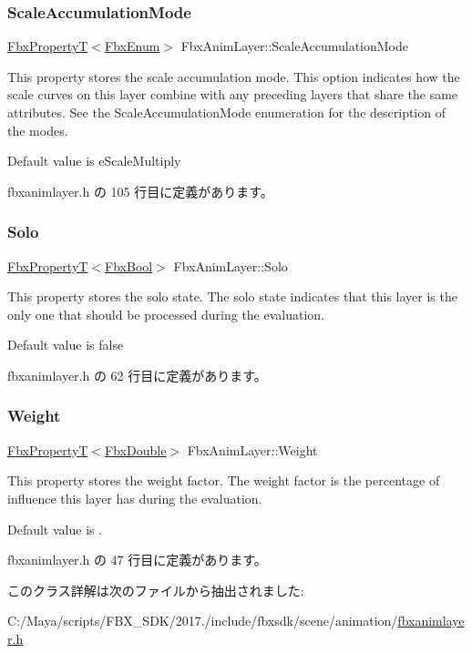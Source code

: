 \subsubsection{\texorpdfstring{Scale\+Accumulation\+Mode}{ScaleAccumulationMode}}
{\footnotesize\ttfamily \hyperlink{class_fbx_property_t}{Fbx\+PropertyT}$<$\hyperlink{fbxtypes_8h_a9a28614cb4272a0ad7d748eda7f3d3e5}{Fbx\+Enum}$>$ Fbx\+Anim\+Layer\+::\+Scale\+Accumulation\+Mode}

This property stores the scale accumulation mode. This option indicates how the scale curves on this layer combine with any preceding layers that share the same attributes. See the Scale\+Accumulation\+Mode enumeration for the description of the modes.

Default value is {\ttfamily e\+Scale\+Multiply} 

 fbxanimlayer.\+h の 105 行目に定義があります。

\mbox{\label{class_fbx_anim_layer_a0e002d0db3b5998a4c016cffb7f5c252}} 
\subsubsection{\texorpdfstring{Solo}{Solo}}
{\footnotesize\ttfamily \hyperlink{class_fbx_property_t}{Fbx\+PropertyT}$<$\hyperlink{fbxtypes_8h_a92e0562b2fe33e76a242f498b362262e}{Fbx\+Bool}$>$ Fbx\+Anim\+Layer\+::\+Solo}

This property stores the solo state. The solo state indicates that this layer is the only one that should be processed during the evaluation.

Default value is {\ttfamily false} 

 fbxanimlayer.\+h の 62 行目に定義があります。

\mbox{\label{class_fbx_anim_layer_a6ab882a24bdf15c3448d064955bf0535}} 
\subsubsection{\texorpdfstring{Weight}{Weight}}
{\footnotesize\ttfamily \hyperlink{class_fbx_property_t}{Fbx\+PropertyT}$<$\hyperlink{fbxtypes_8h_a171e72a1c46fc15c1a6c9c31948c1c5b}{Fbx\+Double}$>$ Fbx\+Anim\+Layer\+::\+Weight}

This property stores the weight factor. The weight factor is the percentage of influence this layer has during the evaluation.

Default value is {.} 

 fbxanimlayer.\+h の 47 行目に定義があります。



このクラス詳解は次のファイルから抽出されました\+:\begin{DoxyCompactItemize}
\item 
C\+:/\+Maya/scripts/\+F\+B\+X\+\_\+\+S\+D\+K/2017./include/fbxsdk/scene/animation/\hyperlink{fbxanimlayer_8h}{fbxanimlayer.\+h}\end{DoxyCompactItemize}
